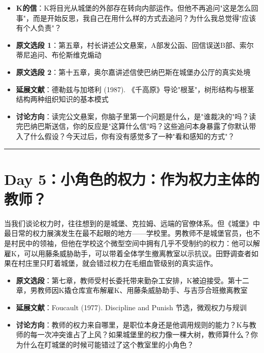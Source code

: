 \documentclass[11pt, a4paper]{ctexart}
\newcommand{\daysep}{\vspace{0.5em}\noindent\rule{\textwidth}{0.2pt}\vspace{0.8em}}
\begin{document}
\vspace{0.5em}

\begin{itemize}
  \item \textbf{K的信}：K将目光从城堡的外部存在转向内部运作。但他不再追问"这是怎么回事"，而是开始反思，我自己在用什么样的方式去追问？为什么我总觉得"应该有个人负责"？
  \item \textbf{原文选段 1}：第五章，村长讲述公文悬案，A部发公函、回信误送B部、索尔蒂尼追问、布伦斯维克煽动
  \item \textbf{原文选段 2}：第十五章，奥尔嘉讲述信使巴纳巴斯在城堡办公厅的真实处境
  \item \textbf{延展文献}：德勒兹与加塔利 (1987). 《千高原》导论"根茎"，树形结构与根茎结构两种组织知识的基本模式
  \item \textbf{讨论方向}：读完公文悬案，你脑子里第一个问题是什么，是"谁裁决的"吗？读完巴纳巴斯送信，你的反应是"这算什么信"吗？这些追问本身暴露了你默认带入了什么假设？今天过后，你有没有感觉多了一种"看和感知的方式"？
\end{itemize}

\daysep

\section*{Day 5：小角色的权力：作为权力主体的教师？}

当我们谈论权力时，往往想到的是城堡、克拉姆、远端的官僚体系。但《城堡》中最日常的权力展演发生在最不起眼的地方——学校里。男教师不是城堡官员，也不是村民中的领袖，但他在学校这个微型空间中拥有几乎不受制约的权力：他可以解雇K，可以用藤条威胁助手，可以带着全体学生撤离教室以示抗议。田野调查者如果在村庄里只盯着城堡，就会错过权力在毛细血管级别的真实运作。

\vspace{0.5em}

\begin{itemize}
  \item \textbf{原文选段}：第七章，教师受村长委托带来勤杂工安排，K被迫接受。第十二章，男教师因K撬仓库宣布解雇K、用藤条威胁助手、与吉莎合班撤离教室
  \item \textbf{延展文献}：Foucault (1977). Discipline and Punish 节选，微观权力与规训
  \item \textbf{讨论方向}：教师的权力来自哪里，是职位本身还是他调用规则的能力？K与教师的每一次冲突谁占了上风？如果城堡里的权力像一棵大树，教师算什么？你为什么在盯城堡的时候可能错过了这个教室里的小角色？
\end{itemize}
\end{document}
